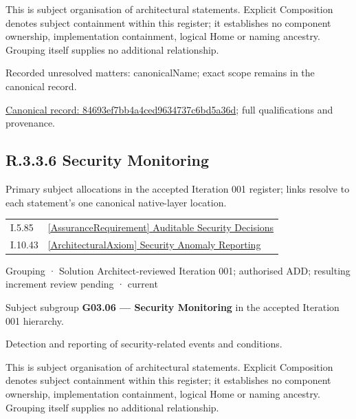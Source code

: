 This is subject organisation of architectural statements. Explicit Composition denotes subject containment within this register; it establishes no component ownership, implementation containment, logical Home or naming ancestry. Grouping itself supplies no additional relationship.


{\small Recorded unresolved matters: canonicalName; exact scope remains in the canonical record.}\par
{\footnotesize \href{../../../../continuum/grouping/84693ef7bb4a4ced9634737c6bd5a36d.md}{Canonical record: 84693ef7bb4a4ced9634737c6bd5a36d}; full qualifications and provenance.}\par
\subsection*{R.3.3.6 Security Monitoring}
\label{navigation:R.3.3.6}

Primary subject allocations in the accepted Iteration 001 register; links resolve to each statement’s one canonical native-layer location.\par
\begin{longtable}{p{.22\linewidth}p{.73\linewidth}}
I.5.85 & \hyperref[element:92ef574eb9b945dfaf6cf2b1b670595b]{[AssuranceRequirement] Auditable Security Decisions} \\
I.10.43 & \hyperref[element:859f884874094c96a6ace15e17131a4c]{[ArchitecturalAxiom] Security Anomaly Reporting} \\
\end{longtable}
\label{element:bb3adbc3c2fb43e6a18a876c4e897c9c}
{\small Grouping · Solution Architect-reviewed Iteration 001; authorised ADD; resulting increment review pending · current}\par

Subject subgroup \textbf{G03.06 — Security Monitoring} in the accepted Iteration 001 hierarchy.



Detection and reporting of security-related events and conditions.



This is subject organisation of architectural statements. Explicit Composition denotes subject containment within this register; it establishes no component ownership, implementation containment, logical Home or naming ancestry. Grouping itself supplies no additional relationship.


